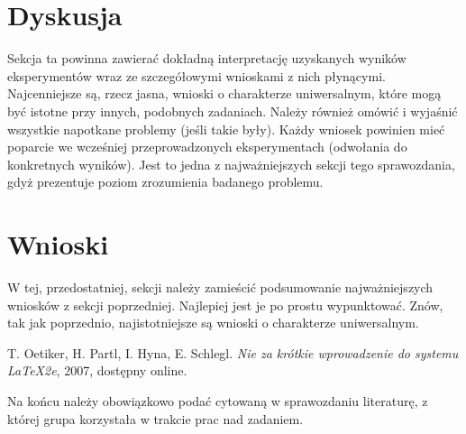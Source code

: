 \documentclass{classrep}
\begin{document}
\section{Dyskusja}
{\color{blue}
Sekcja ta powinna zawierać dokładną interpretację uzyskanych wyników
eksperymentów wraz ze szczegółowymi wnioskami z nich płynącymi. Najcenniejsze
są, rzecz jasna, wnioski o charakterze uniwersalnym, które mogą być istotne
przy innych, podobnych zadaniach. Należy również omówić i wyjaśnić wszystkie
napotkane problemy (jeśli takie były). Każdy wniosek powinien mieć poparcie we
wcześniej przeprowadzonych eksperymentach (odwołania do konkretnych wyników).
Jest to jedna z najważniejszych sekcji tego sprawozdania, gdyż prezentuje
poziom zrozumienia badanego problemu.}

\section{Wnioski}
{\color{blue}
W tej, przedostatniej, sekcji należy zamieścić podsumowanie najważniejszych
wniosków z sekcji poprzedniej. Najlepiej jest je po prostu wypunktować. Znów,
tak jak poprzednio, najistotniejsze są wnioski o charakterze uniwersalnym.}

\begin{thebibliography}{0}
   T. Oetiker, H. Partl, I. Hyna, E. Schlegl.
    \textsl{Nie za krótkie wprowadzenie do systemu \LaTeX2e}, 2007, dostępny
    online.
\end{thebibliography}

{\color{blue}
Na końcu należy obowiązkowo podać cytowaną w sprawozdaniu literaturę, z której
grupa korzystała w trakcie prac nad zadaniem.}
\end{document}
